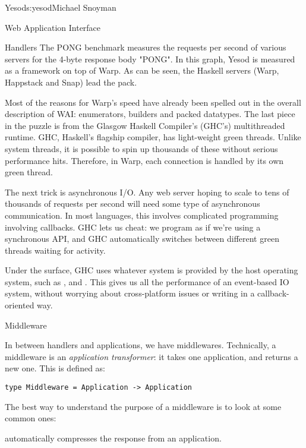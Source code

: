 \begin{aosachapter}{Yesod}{s:yesod}{Michael Snoyman}
\begin{aosasect1}{Web Application Interface}
\begin{aosasect2}{Handlers}
The PONG benchmark measures the requests per second of various servers
for the 4-byte response body "PONG". In this graph, Yesod is measured
as a framework on top of Warp. As can be seen, the Haskell servers
(Warp, Happstack and Snap) lead the pack.


Most of the reasons for Warp's speed have already been spelled out in
the overall description of WAI: enumerators, builders and packed
datatypes. The last piece in the puzzle is from the Glasgow Haskell
Compiler's (GHC's) multithreaded runtime. GHC, Haskell's flagship
compiler, has light-weight green threads. Unlike system threads, it is
possible to spin up thousands of these without serious performance
hits. Therefore, in Warp, each connection is handled by its own green
thread.

The next trick is asynchronous I/O. Any web server hoping to scale to
tens of thousands of requests per second will need some type of
asynchronous communication. In most languages, this involves
complicated programming involving callbacks. GHC lets us cheat: we
program as if we're using a synchronous API, and GHC automatically
switches between different green threads waiting for activity.

Under the surface, GHC uses whatever system is provided by the host
operating system, such as ,  and
. This gives us all the performance of an event-based IO
system, without worrying about cross-platform issues or writing in a
callback-oriented way.

\end{aosasect2}

\begin{aosasect2}{Middleware}

In between handlers and applications, we have
middlewares. Technically, a middleware is an \emph{application
  transformer}: it takes one application, and returns a new one. This
is defined as:

\begin{verbatim}
type Middleware = Application -> Application
\end{verbatim}

The best way to understand the purpose of a middleware is to look at
some common ones:

\begin{aosaitemize}

\item {} automatically compresses the response from an
  application.


\end{aosaitemize}
\end{aosasect2}
\end{aosasect1}
\end{aosachapter}
